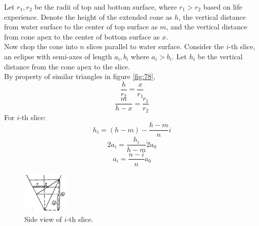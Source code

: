 \documentclass[a4paper]{article}
\begin{document}
Let $r_1, r_2$ be the radii of top and bottom surface, where $r_1 > r_2$ based on life experience. Denote the height of the extended cone as $h$, the vertical distance from water surface to the center of top surface as $m$, and the vertical distance from cone apex to the center of bottom surface as $x$.\\
Now chop the cone into $n$ slices parallel to water surface. Consider the $i$-th slice, an eclipse with semi-axes of length $a_i, b_i$ where $a_i > b_i$. Let $h_i$ be the vertical distance from the cone apex to the slice.\\
By property of similar triangles in figure \ref{fig:78},
\[\frac{h}{r_2} = \frac{x}{r_1}\]
\[\frac{m}{h-x} = \frac{r_1}{r_2}\]
For $i$-th slice: 
\[h_i = (h-m) - \frac{h-m}{n}\dot i\]
\[2 a_i = \frac{h_i}{h - m} \dot 2a_0\]
\[a_i = \frac{n-i}{n} a_0\]



\begin{figure}
\centering
\includegraphics[width=0.2\textwidth]{fig/9.png}
\caption{\label{fig:9}Side view of $i$-th slice.}
\end{figure}
\end{document}
